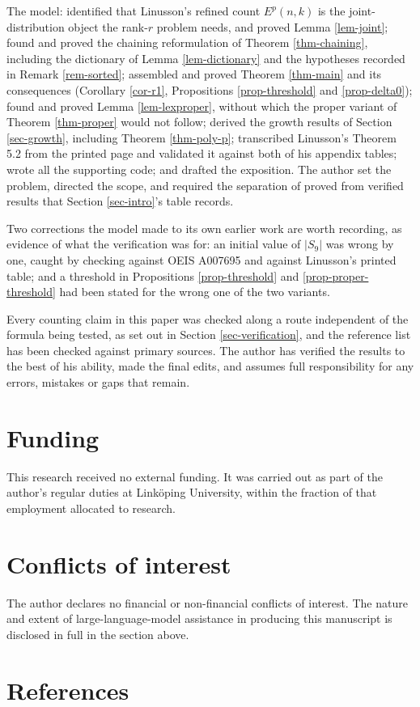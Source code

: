\documentclass[11pt, a4paper, abstract=yes]{scrartcl}
\theoremstyle{definition}
\theoremstyle{remark}
\theoremstyle{plain}
\begin{document}
The model: identified that Linusson's refined count \(E^p(n,k)\) is the joint-distribution object the
rank-\(r\) problem needs, and proved Lemma \ref{lem-joint}; found and proved the chaining reformulation
of Theorem \ref{thm-chaining}, including the dictionary of Lemma \ref{lem-dictionary} and the hypotheses
recorded in Remark \ref{rem-sorted}; assembled and proved Theorem \ref{thm-main} and its consequences
(Corollary \ref{cor-r1}, Propositions \ref{prop-threshold} and \ref{prop-delta0}); found and proved
Lemma \ref{lem-lexproper}, without which the proper variant of Theorem \ref{thm-proper} would not follow;
derived the growth results of Section \ref{sec-growth}, including Theorem \ref{thm-poly-p}; transcribed
Linusson's Theorem 5.2 from the printed page and validated it against both of his appendix tables;
wrote all the supporting code; and drafted the exposition. The author set the problem, directed the
scope, and required the separation of proved from verified results that Section \ref{sec-intro}'s table
records.

Two corrections the model made to its own earlier work are worth recording, as evidence of what the
verification was for: an initial value of \(|S_9|\) was wrong by one, caught by checking against
OEIS A007695 and against Linusson's printed table; and a threshold in Propositions \ref{prop-threshold}
and \ref{prop-proper-threshold} had been stated for the wrong one of the two variants.

Every counting claim in this paper was checked along a route independent of the formula being tested,
as set out in Section \ref{sec-verification}, and the reference list has been checked against primary
sources. The author has verified the results to the best of his ability, made the final edits, and
assumes full responsibility for any errors, mistakes or gaps that remain.
\section*{Funding}
\label{sec:orgf48f6b4}
This research received no external funding. It was carried out as part of the author's regular duties
at Linköping University, within the fraction of that employment allocated to research.
\section*{Conflicts of interest}
\label{sec:org89aa690}
The author declares no financial or non-financial conflicts of interest. The nature and extent of
large-language-model assistance in producing this manuscript is disclosed in full in the section
above.
\section*{References}
\label{sec:org1c689df}
\printbibliography[heading=none]
\end{document}
